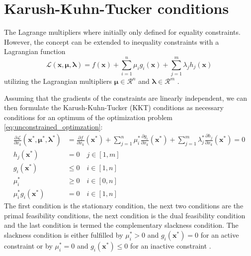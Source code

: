 \section{Karush-Kuhn-Tucker conditions}
The Lagrange multipliers where initially only defined for equality constraints. However, the concept can be extended to inequality constraints with a Lagrangian function 
\begin{equation}
    \mathcal{\mathcal{L}} (\mathbf{x}, \pmb{\mu}, \pmb{\lambda}) = f(\mathbf{x}) + \sum_{i=1}^n \mu_i g_i(\mathbf{x}) + \sum_{j=1}^m \lambda_j h_j(\mathbf{x}) 
\end{equation}
utilizing the Lagrangian multipliers $\pmb{\mu} \in \mathcal{R}^n$ and $\pmb{\lambda} \in \mathcal{R}^m$ \cite{Karush1939, Kuhn1951}.

Assuming that the gradients of the constraints are linearly independent, we can then formulate the Karush-Kuhn-Tucker (KKT) conditions as necessary conditions for an optimum of the optimization problem \eqref{eq:unconstrained_optimzation}: 
\begin{align}
    \frac{\partial \mathcal{\mathcal{L}}}{\partial x_k} (\mathbf{x}^*, \pmb{\mu}^*, \pmb{\lambda}^*) &= 
    \frac{\partial f }{\partial x_k} (\mathbf{x}^*) + \sum_{j=1}^n \mu_i^* \frac{\partial g_i}{\partial x_k} (\mathbf{x}^*) + \sum_{j=1}^m \lambda_j^* \frac{\partial h_j}{\partial x_k} (\mathbf{x}^*) = 0 \\
    h_j(\mathbf{x}^*) &= 0 \quad j \in [1,m]\\
    g_i(\mathbf{x}^*) &\le 0 \quad i \in [1,n]\\
    \mu_i^* &\ge 0 \quad i \in [0,n] \\
    \mu_i^* g_i(\mathbf{x}^*) &=0 \quad i \in [1,n]
\end{align}
The first condition is the stationary condition, the next two conditions are the primal feasibility conditions, the next condition is the dual feasibility condition and the last condition is termed the complementary slackness condition. The slackness condition is either fulfilled by $\mu_i^*>0$ and $g_i(\mathbf{x}^*)=0$ for an active constraint or by  $\mu_i^*=0$ and $g_i(\mathbf{x}^*) \le 0$ for an inactive constraint \cite{Christensen2008, Harzheim2014}.

